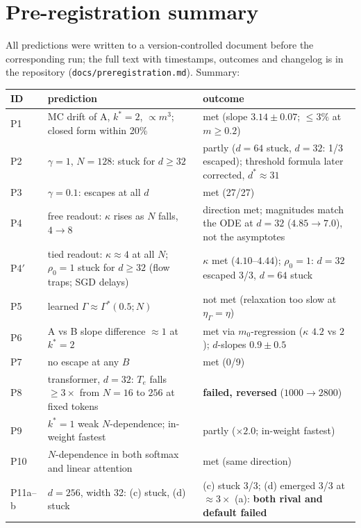 \section{Pre-registration summary}
\label{app:prereg}
All predictions were written to a version-controlled document before the corresponding run; the full text with timestamps,
outcomes and changelog is in the repository (\texttt{docs/preregistration.md}). Summary:

\begin{center}\footnotesize
\begin{tabular}{lp{6.4cm}p{6.4cm}}
\toprule
ID & prediction & outcome \\
\midrule
P1 & MC drift of A, $k^*{=}2$, $\propto m^3$; closed form within 20\% & met (slope $3.14\pm0.07$; $\le3\%$ at $m\ge0.2$) \\
P2 & $\gamma{=}1$, $N{=}128$: stuck for $d\ge32$ & partly ($d{=}64$ stuck, $d{=}32$: 1/3 escaped); threshold formula later corrected, $d^*\approx31$ \\
P3 & $\gamma{=}0.1$: escapes at all $d$ & met (27/27) \\
P4 & free readout: $\kappa$ rises as $N$ falls, $4\to8$ & direction met; magnitudes match the ODE at $d{=}32$ ($4.85\to7.0$), not the asymptotes \\
P4$'$ & tied readout: $\kappa\approx4$ at all $N$; $\rho_0{=}1$ stuck for $d\ge32$ (flow traps; SGD delays) & $\kappa$ met ($4.10$--$4.44$); $\rho_0{=}1$: $d{=}32$ escaped 3/3, $d{=}64$ stuck \\
P5 & learned $\Gamma\approx\Gamma^*(0.5;N)$ & not met (relaxation too slow at $\eta_\Gamma=\eta$) \\
P6 & A vs B slope difference $\approx1$ at $k^*{=}2$ & met via $m_0$-regression ($\kappa$ $4.2$ vs $2$); $d$-slopes $0.9\pm0.5$ \\
P7 & no escape at any $B$ & met (0/9) \\
P8 & transformer, $d{=}32$: $T_e$ falls $\ge3\times$ from $N{=}16$ to $256$ at fixed tokens & \textbf{failed, reversed} ($1000\to2800$) \\
P9 & $k^*{=}1$ weak $N$-dependence; in-weight fastest & partly ($\times2.0$; in-weight fastest) \\
P10 & $N$-dependence in both softmax and linear attention & met (same direction) \\
P11a--b & $d{=}256$, width 32: (c) stuck, (d) stuck & (c) stuck 3/3; (d) emerged 3/3 at $\approx3\times$ (a): \textbf{both rival and default failed} \\

\end{tabular}
\end{center}
